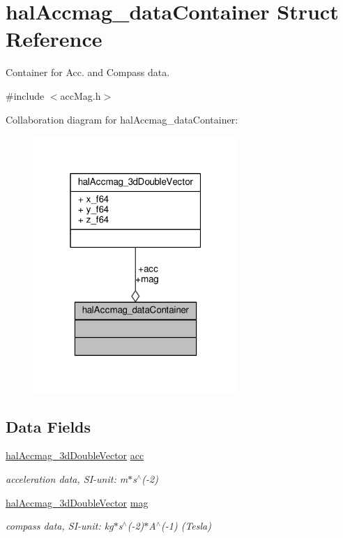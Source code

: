 \hypertarget{structhalAccmag__dataContainer}{\section{hal\+Accmag\+\_\+data\+Container Struct Reference}
\label{structhalAccmag__dataContainer}
}


Container for Acc. and Compass data.  




{\ttfamily \#include $<$acc\+Mag.\+h$>$}



Collaboration diagram for hal\+Accmag\+\_\+data\+Container\+:
\nopagebreak
\begin{figure}[H]
\begin{center}
\leavevmode
\includegraphics[width=220pt]{structhalAccmag__dataContainer__coll__graph}
\end{center}
\end{figure}
\subsection*{Data Fields}
\begin{DoxyCompactItemize}
\item 
\hyperlink{structhalAccmag__3dDoubleVector}{hal\+Accmag\+\_\+3d\+Double\+Vector} \hyperlink{structhalAccmag__dataContainer_afc3847993eed1c8f1e67028ad6d2a6cf_afc3847993eed1c8f1e67028ad6d2a6cf}{acc}
\begin{DoxyCompactList}\small\item\em acceleration data, S\+I-\/unit\+: m$\ast$s$^\wedge$(-\/2) \end{DoxyCompactList}\item 
\hyperlink{structhalAccmag__3dDoubleVector}{hal\+Accmag\+\_\+3d\+Double\+Vector} \hyperlink{structhalAccmag__dataContainer_a903681a66ce49c39267aa66d471812f7_a903681a66ce49c39267aa66d471812f7}{mag}
\begin{DoxyCompactList}\small\item\em compass data, S\+I-\/unit\+: kg$\ast$s$^\wedge$(-\/2)$\ast$\+A$^\wedge$(-\/1) (Tesla) \end{DoxyCompactList}\end{DoxyCompactItemize}


